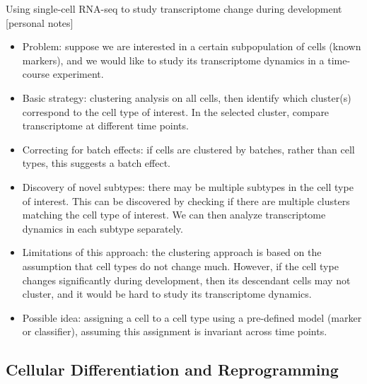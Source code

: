 \documentclass{report}
\begin{document}
Using single-cell RNA-seq to study transcriptome change during development [personal notes]
\begin{itemize}
	
	\item Problem: suppose we are interested in a certain subpopulation of cells (known markers), and we would like to study its transcriptome dynamics in a time-course experiment. 
	
	\item Basic strategy: clustering analysis on all cells, then identify which cluster(s) correspond to the cell type of interest. In the selected cluster, compare transcriptome at different time points. 
	
	\item Correcting for batch effects: if cells are clustered by batches, rather than cell types, this suggests a batch effect. 
	
	\item Discovery of novel subtypes: there may be multiple subtypes in the cell type of interest. This can be discovered by checking if there are multiple clusters matching the cell type of interest. We can then analyze transcriptome dynamics in each subtype separately. 
	
	\item Limitations of this approach: the clustering approach is based on the assumption that cell types do not change much. However, if the cell type changes significantly during development, then its descendant cells may not cluster, and it would be hard to study its transcriptome dynamics. 
	
	\item Possible idea: assigning a cell to a cell type using a pre-defined model (marker or classifier), assuming this assignment is invariant across time points. 
\end{itemize}

\subsection{Cellular Differentiation and Reprogramming}
\end{document}
